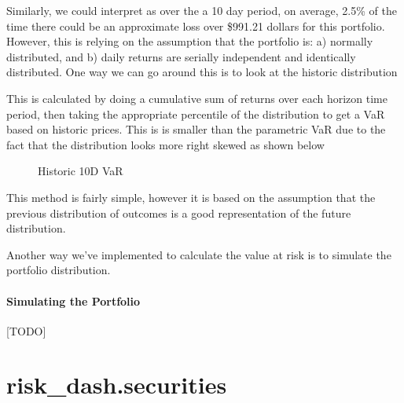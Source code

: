 \documentclass[letterpaper,10pt,english]{sphinxmanual}
\begin{document}
Similarly, we could interpret as over the a 10 day period, on average,
2.5\% of the time there could be an approximate loss over \$991.21 dollars
for this portfolio. However, this is relying on the assumption that the
portfolio is: a) normally distributed, and b) daily returns are serially
independent and identically distributed. One way we can go around this
is to look at the historic distribution

%
\begin{sphinxVerbatim}[commandchars=\\\{\}]
   
\end{sphinxVerbatim}

This is calculated by doing a cumulative sum of returns over each
horizon time period, then taking the appropriate percentile of the
distribution to get a VaR based on historic prices. This is is smaller
than the parametric VaR due to the fact that the distribution looks more
right skewed as shown below

\begin{figure}[htbp]
\centering
\capstart

\noindent{}
\caption{Historic 10D VaR}\label{\detokenize{gettingstarted:id3}}\end{figure}

This method is fairly simple, however it is based on the assumption that
the previous distribution of outcomes is a good representation of the
future distribution.

Another way we’ve implemented to calculate the value at risk is to
simulate the portfolio distribution.


\subsubsection{Simulating the Portfolio}
\label{\detokenize{gettingstarted:simulating-the-portfolio}}
{[}TODO{]}


\chapter{risk\_dash.securities}
\label{\detokenize{securities:module-risk_dash.securities}}\label{\detokenize{securities:risk-dash-securities}}\label{\detokenize{securities:securities}}\label{\detokenize{securities::doc}}
\end{document}
